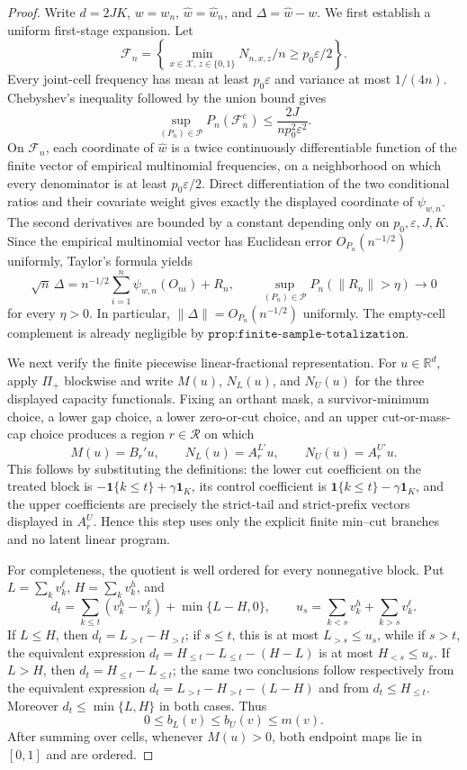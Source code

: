 \documentclass{article}
\begin{document}
\begin{proof}
Write \(d=2JK\), \(w=w_n\), \(\widehat w=\widehat w_n\), and \(\Delta=\widehat w-w\). We first establish a uniform first-stage expansion. Let
\[
 \mathcal F_n=\left\{\min_{x\in\mathcal X,\,z\in\{0,1\}}
                   N_{n,x,z}/n\ge p_0\varepsilon/2\right\}.
\]
Every joint-cell frequency has mean at least \(p_0\varepsilon\) and variance at most \(1/(4n)\). Chebyshev's inequality followed by the union bound gives
\[
 \sup_{(P_n)\in\mathcal P}P_n(\mathcal F_n^c)
 \le \frac{2J}{n p_0^2\varepsilon^2}.
\]
On \(\mathcal F_n\), each coordinate of \(\widehat w\) is a twice continuously differentiable function of the finite vector of empirical multinomial frequencies, on a neighborhood on which every denominator is at least \(p_0\varepsilon/2\). Direct differentiation of the two conditional ratios and their covariate weight gives exactly the displayed coordinate of \(\psi_{w,n}\). The second derivatives are bounded by a constant depending only on \(p_0,\varepsilon,J,K\). Since the empirical multinomial vector has Euclidean error \(O_{P_n}(n^{-1/2})\) uniformly, Taylor's formula yields
\[
 \sqrt n\,\Delta
 =n^{-1/2}\sum_{i=1}^n\psi_{w,n}(O_{ni})+R_n,
 \qquad
 \sup_{(P_n)\in\mathcal P}P_n(\lVert R_n\rVert>\eta)\longrightarrow0
\]
for every \(\eta>0\). In particular, \(\lVert\Delta\rVert=O_{P_n}(n^{-1/2})\) uniformly. The empty-cell complement is already negligible by \(\texttt{prop:finite-sample-totalization}\).

We next verify the finite piecewise linear-fractional representation. For \(u\in\mathbb R^d\), apply \(\Pi_+\) blockwise and write \(M(u)\), \(N_L(u)\), and \(N_U(u)\) for the three displayed capacity functionals. Fixing an orthant mask, a survivor-minimum choice, a lower gap choice, a lower zero-or-cut choice, and an upper cut-or-mass-cap choice produces a region \(r\in\mathcal R\) on which
\[
 M(u)=B_r'u,\qquad N_L(u)=A_r^{L\prime}u,\qquad
 N_U(u)=A_r^{U\prime}u.
\]
This follows by substituting the definitions: the lower cut coefficient on the treated block is
\(-\mathbf1\{k\le t\}+\gamma\mathbf1_K\), its control coefficient is
\(\mathbf1\{k\le t\}-\gamma\mathbf1_K\), and the upper coefficients are precisely the strict-tail and strict-prefix vectors displayed in \(A_r^U\). Hence this step uses only the explicit finite min--cut branches and no latent linear program.

For completeness, the quotient is well ordered for every nonnegative block. Put \(L=\sum_kv_k^\ell\), \(H=\sum_kv_k^h\), and
\[
 d_t=\sum_{k\le t}(v_k^h-v_k^\ell)+\min\{L-H,0\},
 \qquad u_s=\sum_{k<s}v_k^h+\sum_{k>s}v_k^\ell.
\]
If \(L\le H\), then \(d_t=L_{>t}-H_{>t}\); if \(s\le t\), this is at most \(L_{>s}\le u_s\), while if \(s>t\), the equivalent expression
\(d_t=H_{\le t}-L_{\le t}-(H-L)\) is at most \(H_{<s}\le u_s\). If \(L>H\), then \(d_t=H_{\le t}-L_{\le t}\); the same two conclusions follow respectively from the equivalent expression
\(d_t=L_{>t}-H_{>t}-(L-H)\) and from \(d_t\le H_{\le t}\). Moreover \(d_t\le\min\{L,H\}\) in both cases. Thus
\[
 0\le b_L(v)\le b_U(v)\le m(v).
\]
After summing over cells, whenever \(M(u)>0\), both endpoint maps lie in \([0,1]\) and are ordered.


\end{proof}
\end{document}
